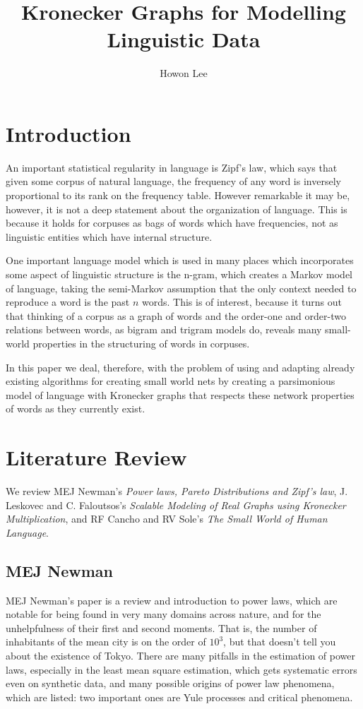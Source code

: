 \documentclass[12pt]{article}
\begin{document}
\title{Kronecker Graphs for Modelling Linguistic Data}
\author{Howon Lee}
\maketitle

\section{Introduction}

An important statistical regularity in language is Zipf's law, which says that given some corpus of natural language, the frequency of any word is inversely proportional to its rank on the frequency table. However remarkable it may be, however, it is not a deep statement about the organization of language. This is because it holds for corpuses as bags of words which have frequencies, not as linguistic entities which have internal structure. %

One important language model which is used in many places which incorporates some aspect of linguistic structure is the n-gram, which creates a Markov model of language, taking the semi-Markov assumption that the only context needed to reproduce a word is the past $n$ words. This is of interest, because it turns out that thinking of a corpus as a graph of words and the order-one and order-two relations between words, as bigram and trigram models do, reveals many small-world properties in the structuring of words in corpuses. %

In this paper we deal, therefore, with the problem of using and adapting already existing algorithms for creating small world nets by creating a parsimonious model of language with Kronecker graphs that respects these network properties of words as they currently exist.

\section{Literature Review}

We review MEJ Newman's \emph{Power laws, Pareto Distributions and Zipf's law}, J. Leskovec and C. Faloutsos's \emph{Scalable Modeling of Real Graphs using Kronecker Multiplication}, and RF Cancho and RV Sole's \emph{The Small World of Human Language}. %

\subsection{MEJ Newman}
MEJ Newman's paper is a review and introduction to power laws, which are notable for being found in very many domains across nature, and for the unhelpfulness of their first and second moments. That is, the number of inhabitants of the mean city is on the order of $10^3$, but that doesn't tell you about the existence of Tokyo. There are many pitfalls in the estimation of power laws, especially in the least mean square estimation, which gets systematic errors even on synthetic data, and many possible origins of power law phenomena, which are listed: two important ones are Yule processes and critical phenomena.
\end{document}
